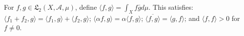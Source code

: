 For $f, g \in \mathfrak{L}_2(X, \mathcal{A}, \mu)$, define $\langle f, g \rangle = \int_X f \bar{g} d\mu$. This satisfies: $\langle f_1+f_2, g \rangle = \langle f_1, g \rangle + \langle f_2, g \rangle$; $\langle \alpha f, g \rangle = \alpha \langle f, g \rangle$; $\overline{\langle f, g \rangle} = \langle g, f \rangle$; and $\langle f, f \rangle > 0$ for $f \neq 0$.
